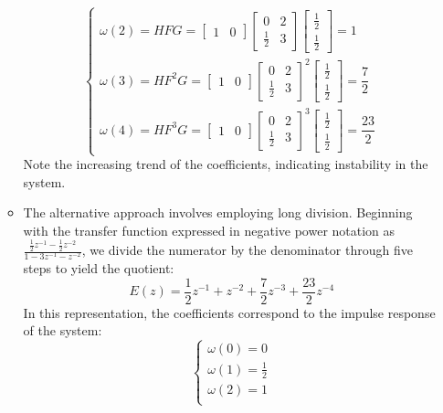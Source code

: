 \begin{enumerate}
\begin{itemize}
\[\begin{cases}
                    \omega(2)=HFG=\begin{bmatrix} 1 & 0 \end{bmatrix}\begin{bmatrix} 0 & 2 \\ \frac{1}{2} & 3 \end{bmatrix}\begin{bmatrix} \frac{1}{2} \\ \frac{1}{2} \end{bmatrix}=1 \\
                    \omega(3)=HF^2G=\begin{bmatrix} 1 & 0 \end{bmatrix}\begin{bmatrix} 0 & 2 \\ \frac{1}{2} & 3 \end{bmatrix}^2\begin{bmatrix} \frac{1}{2} \\ \frac{1}{2} \end{bmatrix}=\dfrac{7}{2} \\
                    \omega(4)=HF^3G=\begin{bmatrix} 1 & 0 \end{bmatrix}\begin{bmatrix} 0 & 2 \\ \frac{1}{2} & 3 \end{bmatrix}^3\begin{bmatrix} \frac{1}{2} \\ \frac{1}{2} \end{bmatrix}=\dfrac{23}{2}
                \end{cases}\]
                Note the increasing trend of the coefficients, indicating instability in the system.
            \item The alternative approach involves employing long division. 
                Beginning with the transfer function expressed in negative power notation as $\frac{\frac{1}{2}z^{-1}-\frac{1}{2}z^{-2}}{1-3z^{-1}-z^{-2}}$, we divide the numerator by the denominator through five steps to yield the quotient:
                \[E(z)=\dfrac{1}{2}z^{-1}+z^{-2}+\dfrac{7}{2}z^{-3}+\dfrac{23}{2}z^{-4}\]
                In this representation, the coefficients correspond to the impulse response of the system:
                \[\begin{cases}
                    \omega(0)=0 \\
                    \omega(1)=\frac{1}{2} \\
                    \omega(2)=1 \\

\end{cases}\]
\end{itemize}
\end{enumerate}
